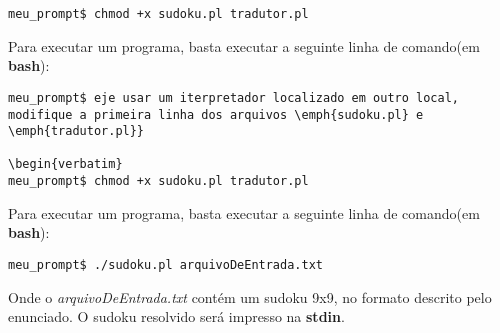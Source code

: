 \documentclass[11pt]{article}
\begin{document}
\begin{verbatim}
meu_prompt$ chmod +x sudoku.pl tradutor.pl
\end{verbatim}

Para executar um programa, basta executar a seguinte linha de comando(em \textbf{\color{red}bash}):

\begin{verbatim}
meu_prompt$ eje usar um iterpretador localizado em outro local, modifique a primeira linha dos arquivos \emph{sudoku.pl} e \emph{tradutor.pl}}

\begin{verbatim}
meu_prompt$ chmod +x sudoku.pl tradutor.pl
\end{verbatim}

Para executar um programa, basta executar a seguinte linha de comando(em \textbf{\color{red}bash}):

\begin{verbatim}
meu_prompt$ ./sudoku.pl arquivoDeEntrada.txt
\end{verbatim}

Onde o \emph{arquivoDeEntrada.txt} contém um sudoku 9x9, no formato descrito pelo enunciado. O sudoku resolvido será impresso na \textbf{\color{red}stdin}.
\end{document}
